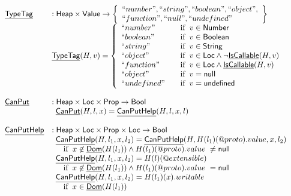 \documentclass{article}
\makeatletter
\newcommand{\SF}[1]{\mbox{\textsf{#1}}}
\newcommand{\ifc}[1]{{\rm if}\begin{array}[t]{l}#1\end{array}}
\newcommand{\Heap}{\SF{Heap}}
\newcommand{\Loc}{\SF{Loc}}
\newcommand{\Prop}{\SF{Prop}}
\newcommand{\Value}{\SF{Value}}
\newcommand{\set}[1]{\left\{\begin{array}{l}#1\end{array}\right\}}
\newcommand{\hf}[1]{\underline{\sf #1}}
\newcommand{\varprop}[1]{@#1}
\makeatother
\begin{document}
\[
\begin{array}{ll}
\hf{TypeTag} & : \Heap \times \Value \rightarrow \set{``number", ``string", ``boolean", ``object",\\ ``function", ``null", ``undefined"}\\
& \hf{TypeTag}(H,v) = \left\{
\begin{array}{l@{\quad\quad}l}
  ``number" & \ifc{v \in \SF{Number}} \\
  ``boolean" & \ifc{v \in \SF{Boolean}} \\
  ``string" & \ifc{v \in \SF{String}} \\
  ``object" & \ifc{v \in \SF{Loc}\land\lnot\hf{IsCallable}(H,v)} \\
  ``function" & \ifc{v \in \SF{Loc}\land\hf{IsCallable}(H,v)} \\
  ``object" & \ifc{v = \SF{null}} \\
  ``undefined" & \ifc{v = \SF{undefined}} \\
\end{array}
\right. \\
\\

\hf{CanPut} & : \Heap \times \Loc \times \Prop \rightarrow \SF{Bool}\\
&
\begin{array}{ll}
  \hf{CanPut}(H,l,x) = \hf{CanPutHelp}(H,l,x,l) & \\
\end{array}
\\\\

\hf{CanPutHelp} & : \Heap \times \Loc \times \Prop \times \Loc
\rightarrow \SF{Bool}\\
&
\begin{array}{ll}
  \hf{CanPutHelp}(H,l_1,x,l_2) = \hf{CanPutHelp}(H,H(l_1)(\varprop{proto}).value,x,l_2) &\\
   \quad\ifc{x\not\in\hf{Dom}(H(l_1)) \land H(l_1)(\varprop{proto}).value\ \neq \SF{null}}&\\
  \hf{CanPutHelp}(H,l_1,x,l_2) = H(l)(\varprop{extensible}) &\\
  \quad\ifc{x\not\in\hf{Dom}(H(l_1)) \land H(l_1)(\varprop{proto}).value\ = \SF{null}}&\\
  \hf{CanPutHelp}(H,l_1,x,l_2) = H(l_1)(x).writable &\\
  \quad\ifc{x\in\hf{Dom}(H(l_1))}&\\
\end{array}
\\\\


\end{array}\]
\end{document}
